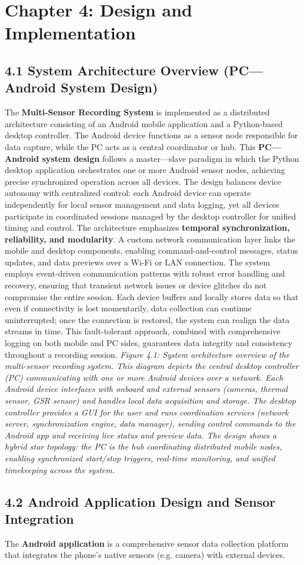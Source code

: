 \label{chap:4} \chapter{Chapter 4: Design and Implementation} \section{4.1 System Architecture Overview (PC---Android System Design)} The \textbf{Multi-Sensor Recording System} is implemented as a distributed architecture consisting of an Android mobile application and a Python-based desktop controller. The Android device functions as a sensor node responsible for data capture, while the PC acts as a central coordinator or hub. This \textbf{PC---Android system design} follows a master---slave paradigm in which the Python desktop application orchestrates one or more Android sensor nodes, achieving precise synchronized operation across all devices. The design balances device autonomy with centralized control: each Android device can operate independently for local sensor management and data logging, yet all devices participate in coordinated sessions managed by the desktop controller for unified timing and control. The architecture emphasizes \textbf{temporal synchronization, reliability, and modularity}. A custom network communication layer links the mobile and desktop components, enabling command-and-control messages, status updates, and data previews over a Wi-Fi or LAN connection. The system employs event-driven communication patterns with robust error handling and recovery, ensuring that transient network issues or device glitches do not compromise the entire session. Each device buffers and locally stores data so that even if connectivity is lost momentarily, data collection can continue uninterrupted; once the connection is restored, the system can realign the data streams in time. This fault-tolerant approach, combined with comprehensive logging on both mobile and PC sides, guarantees data integrity and consistency throughout a recording session. \textit{Figure 4.1: System architecture overview of the multi-sensor recording system. This diagram depicts the central} \textit{desktop controller} \textit{(PC) communicating with one or more} \textit{Android devices} \textit{over a network. Each Android device interfaces with onboard and external sensors (cameras, thermal sensor, GSR sensor) and handles local data acquisition and storage. The desktop controller provides a GUI for the user and runs coordination services (network server, synchronization engine, data manager), sending control commands to the Android app and receiving live status and preview data. The design shows a} \textit{hybrid star topology: the PC is the hub coordinating distributed mobile nodes, enabling synchronized start/stop triggers, real-time monitoring, and unified timekeeping across the system.} \section{4.2 Android Application Design and Sensor Integration} The \textbf{Android application} is a comprehensive sensor data collection platform that integrates the phone's native sensors (e.g. camera) with external devices. 